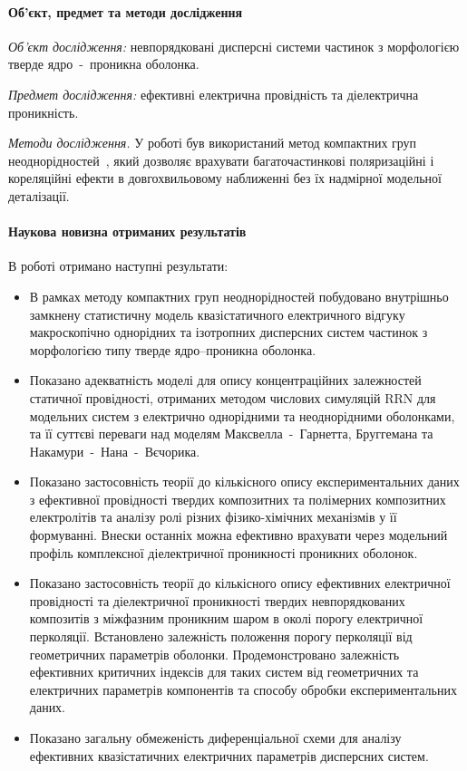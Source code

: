 \paragraph{Об'єкт, предмет та методи дослідження}\hfill\par

\textit{Об'єкт дослідження:} невпорядковані дисперсні системи частинок з морфологією тверде ядро~-~проникна оболонка.

\textit{Предмет дослідження:} ефективні електрична провідність та діелектрична проникність.

\textit{Методи дослідження.} У роботі був використаний метод 
компактних груп неоднорідностей~\cite{Sushko2007, Sushko2009, 
SushkoJPD2009, Sushko2017}, який дозволяє врахувати 
багаточастинкові поляризаційні і кореляційні ефекти в 
довгохвильовому наближенні без їх надмірної модельної деталізації.


\paragraph{Наукова новизна отриманих результатів}\hfill\par
В роботі отримано наступні результати:

\begin{itemize}
\item 
В рамках методу компактних груп неоднорідностей побудовано 
внутрішньо замкнену статистичну модель квазістатичного 
електричного відгуку макроскопічно однорідних та ізотропних 
дисперсних систем частинок з морфологією типу тверде 
ядро--проникна оболонка.
\item
Показано адекватність моделі для опису концентраційних 
залежностей статичної провідності, отриманих методом числових 
симуляцій RRN для  модельних систем з електрично однорідними 
та неоднорідними оболонками,  та її суттєві переваги  над 
моделям Максвелла~-~Гарнетта, Бруггемана та Накамури~-~Нана~-~Вєчорика. 
\item
Показано застосовність теорії до кількісного опису 
експериментальних даних з ефективної провідності твердих 
композитних та полімерних композитних електролітів та 
аналізу ролі різних фізико-хімічних механізмів у її формуванні. 
Внески останніх можна ефективно врахувати через модельний профіль 
комплексної діелектричної проникності проникних оболонок. 
\item
Показано застосовність теорії до кількісного опису ефективних 
електричної провідності та діелектричної проникності твердих 
невпорядкованих композитів з міжфазним проникним шаром в околі порогу електричної 
перколяції. Встановлено залежність положення порогу перколяції 
від геометричних параметрів оболонки. Продемонстровано 
залежність ефективних  критичних індексів для таких систем 
від геометричних та електричних параметрів компонентів та 
способу обробки експериментальних даних.
\item
Показано загальну обмеженість 
диференціальної схеми для аналізу ефективних квазістатичних 
електричних параметрів дисперсних систем.
\end{itemize}


